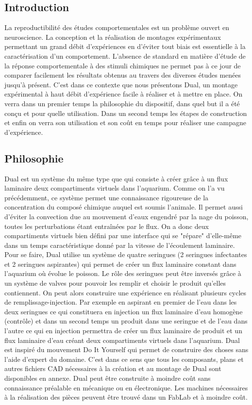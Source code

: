   \subsection{Introduction}
  La reproductibilité des études comportementales est un problème ouvert en neuroscience. La conception et la réalisation de montages expérimentaux permettant un grand débit d'expériences en d'éviter tout biais est essentielle à la caractérisation d'un comportement. L'absence de standard en matière d'étude de la réponse comportementale à des stimuli chimiques ne permet pas à ce jour de comparer facilement les résultats obtenus au travers des diverses études menées jusqu'à présent. C'est dans ce contexte que nous présentons Dual, un montage expérimental à haut débit d'expérience facile à réaliser et à mettre en place.
  \medbreak
  On verra dans un premier temps la philosophie du dispositif, dans quel but il a été conçu et pour quelle utilisation. Dans un second temps les étapes de construction et enfin on verra son utilisation et son coût en temps pour réaliser une campagne d'expérience.
  \subsection{Philosophie}
  Dual est un système du même type que \cite{readman2013fish} qui consiste à créer grâce à un flux laminaire deux compartiments virtuels dans l'aquarium. Comme on l'a vu précédemment, ce système permet une connaissance rigoureuse de la concentration du composé chimique auquel est soumis l'animale. Il permet aussi d'éviter la convection due au mouvement d'eaux engendré par la nage du poisson, toutes les perturbations étant entraînées par le flux. On a donc deux compartiments virtuels bien défini par une interface qui se "répare" d'elle-même dans un temps caractéristique donné par la vitesse de l'écoulement laminaire. 
  \medbreak
  Pour se faire, Dual utilise un système de quatre seringues (2 seringues infectantes et 2 seringues aspirantes) qui permet de créer un flux laminaire constant dans l'aquarium où évolue le poisson. Le rôle des seringues peut être inversés grâce à un système de valves pour pouvoir les remplir et choisir le produit qu'elles contiennent. On peut alors construire une expérience en réalisant plusieurs cycles de remplissage-injection. Par exemple en aspirant en premier de l'eau dans les deux seringues ce qui constituera en injection un flux laminaire d'eau homogène (contrôle) et dans un second temps un produit dans une seringue et de l'eau dans l'autre ce qui en injection permettra de créer un flux laminaire de produit et un flux laminaire d'eau créant deux compartiments virtuels dans l'aquarium. 
  \medbreak
  Dual est inspiré du mouvement Do It Yourself qui permet de construire des choses sans l'aide d'expert du domaine. C'est dans ce sens que tous les composants, plans et autres fichiers CAD nécessaires à la création et au montage de Dual sont disponibles en annexe. Dual peut être construite à moindre coût sans connaissance préalable en mécanique ou en électronique. Les machines nécessaires à la réalisation des pièces peuvent être trouvé dans un FabLab et à moindre coût.
